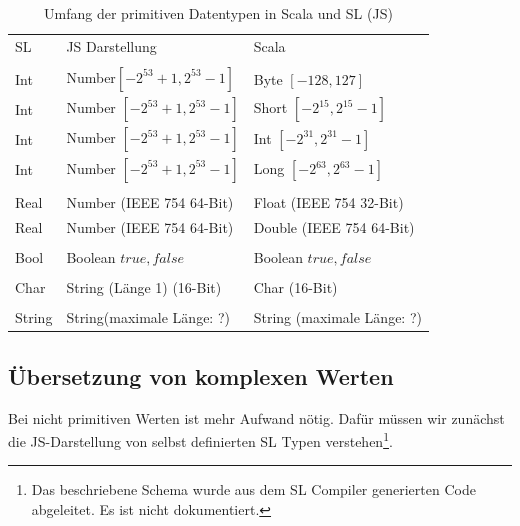 \documentclass[12pt]{scrreprt}
\begin{document}
\begin{table}
\caption{Umfang der primitiven Datentypen in Scala und \ac{SL} (\ac{JS})\cite[S. 28-30]{Ecma2011}\cite{Oracle2011}}
\centering
\begin{tabular}{lll}
 \ac{SL} &    \ac{JS} Darstellung              &    Scala \\
\\
Int  &  Number\footnotemark $[-2^{53} + 1, 2^{53} -1]$   &  Byte  $[-128, 127]$\\
Int  &  Number $[-2^{53} + 1, 2^{53} -1]$   &  Short $[-2^{15}, 2^{15}-1]$\\
Int  & Number $[-2^{53} + 1, 2^{53} -1]$    & Int   $[-2^{31}, 2^{31}-1]$\\
Int  &  Number $[-2^{53} + 1, 2^{53} -1]$   &  Long  $[-2^{63}, 2^{63}-1]$\\
\\
Real &  Number (IEEE 754 64-Bit)      &  Float  (IEEE 754 32-Bit)\\
Real &  Number (IEEE 754 64-Bit)      &  Double (IEEE 754 64-Bit)\\
\\
Bool &  Boolean ${true, false}$         &  Boolean ${true, false}$\\
\\
Char &  String (Länge 1) (16-Bit)     &  Char (16-Bit)\\
\\
String& String\footnotemark (maximale Länge: ?)    &  String (maximale Länge: ?)\\
\end{tabular}
\label{tab:primitives-borders}
\end{table}

\subsection{Übersetzung von komplexen Werten}

Bei nicht primitiven Werten ist mehr Aufwand nötig. Dafür müssen wir zunächst die JS-Darstellung von selbst definierten SL Typen verstehen\footnote{Das beschriebene Schema wurde aus dem SL Compiler generierten Code abgeleitet. Es ist nicht dokumentiert.}.
\end{document}

